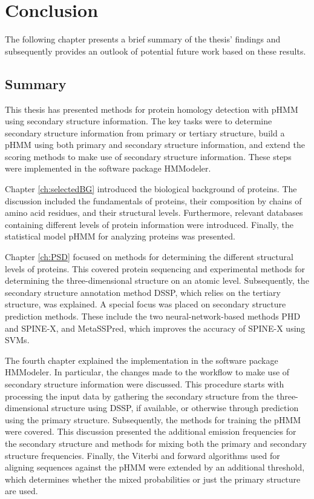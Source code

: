 \chapter{Conclusion}
\label{ch:conclusion}

The following chapter presents a brief summary of the thesis' findings and subsequently provides an outlook of potential future work based on these results.

\section{Summary}

This thesis has presented methods for protein homology detection with \ac{pHMM} using secondary structure information. The key tasks were to determine secondary structure information from primary or tertiary structure, build a \ac{pHMM} using both primary and secondary structure information, and extend the scoring methods to make use of secondary structure information. These steps were implemented in the software package HMModeler. 

Chapter \ref{ch:selectedBG} introduced the biological background of proteins. The discussion included the fundamentals of proteins, their composition by chains of amino acid residues, and their structural levels. Furthermore, relevant databases containing different levels of protein information were introduced. Finally, the statistical model \ac{pHMM} for analyzing proteins was presented.



Chapter \ref{ch:PSD} focused on methods for determining the different structural levels of proteins. This covered protein sequencing and experimental methods for determining the three-dimensional structure on an atomic level. Subsequently, the secondary structure annotation method \ac{DSSP}, which relies on the tertiary structure, was explained. A special focus was placed on secondary structure prediction methods. These include the two neural-network-based methods \ac{PHD} and SPINE-X, and MetaSSPred, which improves the accuracy of SPINE-X using \acp{SVM}.


The fourth chapter explained the implementation in the software package HMModeler. In particular, the changes made to the workflow to make use of secondary structure information were discussed. This procedure starts with processing the input data by gathering the secondary structure from the three-dimensional structure using \ac{DSSP}, if available, or otherwise through prediction using the primary structure. Subsequently, the methods for training the \ac{pHMM} were covered. This discussion presented the additional emission frequencies for the secondary structure and methods for mixing both the primary and secondary structure frequencies. Finally, the Viterbi and forward algorithms used for aligning sequences against the pHMM were extended by an additional threshold, which determines whether the mixed probabilities or just the primary structure are used.


